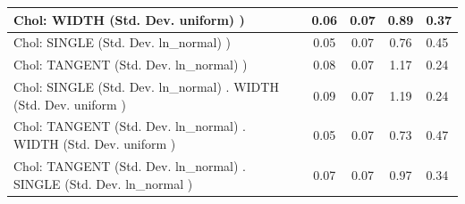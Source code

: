 \begin{table}
\begin{center}
\begin{tabular}{|l|l|c|c|c|l|}
			\hline
			 Chol: WIDTH (Std. Dev. uniform) ) &  & 0.06 & 0.07 & 0.89 & 0.37 \\
			\hline
			 Chol: SINGLE (Std. Dev. ln_normal) ) &  & 0.05 & 0.07 & 0.76 & 0.45 \\
			\hline
			 Chol: TANGENT (Std. Dev. ln_normal) ) &  & 0.08 & 0.07 & 1.17 & 0.24 \\
			\hline
			 Chol: SINGLE (Std. Dev. ln_normal) . WIDTH (Std. Dev.   uniform ) &  & 0.09 & 0.07 & 1.19 & 0.24 \\
			\hline
			 Chol: TANGENT (Std. Dev. ln_normal) . WIDTH (Std. Dev.   uniform ) &  & 0.05 & 0.07 & 0.73 & 0.47 \\
			\hline
			 Chol: TANGENT (Std. Dev. ln_normal) . SINGLE (Std. Dev.   ln_normal ) &  & 0.07 & 0.07 & 0.97 & 0.34 \\
			\hline
		\end{tabular}
	\end{center}
\end{table}